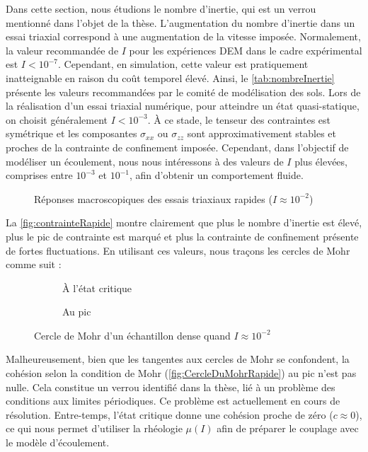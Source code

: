 \documentclass[a4paper,12pt]{report}
\begin{document}
Dans cette section, nous étudions le nombre d’inertie, qui est un verrou mentionné dans l’objet de la thèse.  
L’augmentation du nombre d’inertie dans un essai triaxial correspond à une augmentation de la vitesse imposée.  
Normalement, la valeur recommandée de $I$ pour les expériences DEM dans le cadre expérimental est $I < 10^{-7}$.  
Cependant, en simulation, cette valeur est pratiquement inatteignable en raison du coût temporel élevé.  
Ainsi, le \autoref{tab:nombreInertie} présente les valeurs recommandées par le comité de modélisation des sols.  
Lors de la réalisation d’un essai triaxial numérique, pour atteindre un état quasi-statique, on choisit généralement $I < 10^{-3}$.  
À ce stade, le tenseur des contraintes est symétrique et les composantes $\sigma_{xx}$ ou $\sigma_{zz}$ sont approximativement stables et proches de la contrainte de confinement imposée.  
Cependant, dans l’objectif de modéliser un écoulement, nous nous intéressons à des valeurs de $I$ plus élevées, comprises entre $10^{-3}$ et $10^{-1}$, afin d’obtenir un comportement fluide.

\begin{figure}[h!]
\centering
\scalebox{0.5}{}
\caption{Réponses macroscopiques des essais triaxiaux rapides ($I \approx 10^{-2}$)}
\label{fig:contrainteRapide}
\end{figure}

La \autoref{fig:contrainteRapide} montre clairement que plus le nombre d’inertie est élevé, plus le pic de contrainte est marqué et plus la contrainte de confinement présente de fortes fluctuations.  
En utilisant ces valeurs, nous traçons les cercles de Mohr comme suit :

\begin{figure}[htbp]
    \centering
    \begin{subfigure}[b]{0.49\textwidth}
        \centering
        \scalebox{0.5}{}
        \caption{À l’état critique}
        \label{fig:muresiduel}
    \end{subfigure}
    \hfill
    \begin{subfigure}[b]{0.49\textwidth}
        \centering
        \scalebox{0.5}{}
        \caption{Au pic}
        \label{fig:mutransitore}
    \end{subfigure}
    \caption{Cercle de Mohr d’un échantillon dense quand $I \approx 10^{-2}$}
    \label{fig:CercleDuMohrRapide}
\end{figure}

Malheureusement, bien que les tangentes aux cercles de Mohr se confondent, la cohésion selon la condition de Mohr (\autoref{fig:CercleDuMohrRapide}) au pic n’est pas nulle.  
Cela constitue un verrou identifié dans la thèse, lié à un problème des conditions aux limites périodiques. Ce problème est actuellement en cours de résolution.  
Entre-temps, l’état critique donne une cohésion proche de zéro ($c \approx 0$), ce qui nous permet d’utiliser la rhéologie $\mu(I)$ afin de préparer le couplage avec le modèle d’écoulement.
\end{document}
